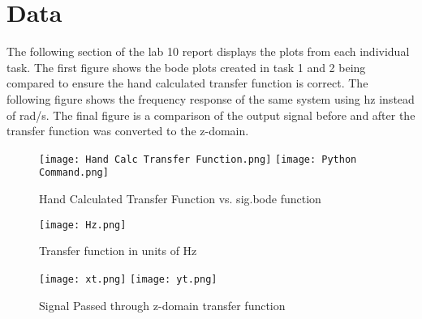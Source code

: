 \documentclass[12pt]{report}
\begin{document}
\section{Data}
\hspace{\parindent}The following section of the lab 10 report displays the plots from each individual task. The first figure shows the bode plots created in task 1 and 2 being compared to ensure the hand calculated transfer function is correct. The following figure shows the frequency response of the same system using hz instead of rad/s. The final figure is a comparison of the output signal before and after the transfer function was converted to the z-domain.
\begin{figure}[h!]
    \centering
    \texttt{[image: Hand Calc Transfer Function.png]}
    \texttt{[image: Python Command.png]}    
    \caption{Hand Calculated Transfer Function vs. sig.bode function}
    \label{Figure x:}
\end{figure}
\begin{figure}[h!]
    \centering
    \texttt{[image: Hz.png]}
    \caption{Transfer function in units of Hz}
    \label{Figure x:}
\end{figure}
\begin{figure}[h!]
    \centering
    \texttt{[image: xt.png]}
    \texttt{[image: yt.png]}
    \caption{Signal Passed through z-domain transfer function}
    \label{Figure x:}
\end{figure}
\\\\\\\\\\\\\\\\\\\\\\\\\\\\\\\\\\\\\\\\\\\\\\\\\\\\\\\\\\\\\\\\\\\\\\\\\\\\
\end{document}
